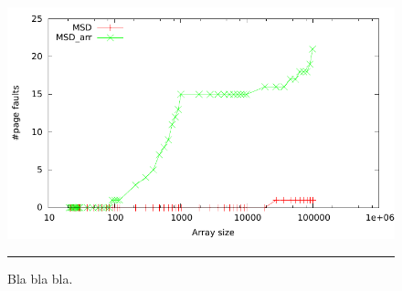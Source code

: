 \begin{figure}[htbp]
	\centering
		\includegraphics[width=\textwidth]{./Figures/Project2b/Page_faults.pdf}
		\rule{35em}{0.5pt}
	\caption[Page faults]{
	Bla bla bla.
	}
	\label{fig:Page_faults}
\end{figure}


